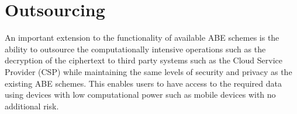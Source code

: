 


\section{Outsourcing}

An important extension to the functionality of available ABE schemes is the ability to outsource the computationally intensive operations such as the decryption of the ciphertext to third party systems such as the Cloud Service Provider (CSP) while maintaining the same levels of security and privacy as the existing ABE schemes. This enables users to have access to the required data using devices with low computational power such as mobile devices with no additional risk.

